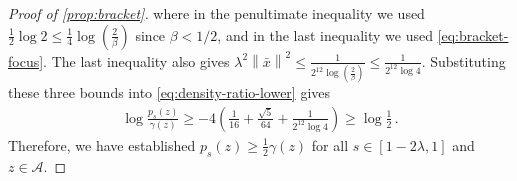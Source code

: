 \documentclass{article}
\newcommand{\1}{\mathbf 1}
\newcommand{\norm}[1]{\left\lVert #1\right\rVert}
\begin{document}
\begin{proof}[Proof of \cref{prop:bracket}]
    where in the penultimate inequality we used $
        \frac12\log2
        \leq \frac14\log\left(\frac{2}{\beta}\right)$ since $\beta<1/2$,
    and in the last inequality we used \eqref{eq:bracket-focus}.
    The last inequality also gives
    $\lambda^2\norm{\bar{x}}^2
        \leq
        \frac{1}{2^{12} \log\left(\frac{2}{\beta}\right)}
        \leq
        \frac{1}{2^{12} \log4}$.
    Substituting these three bounds into
    \eqref{eq:density-ratio-lower} gives
    \begin{align}
        \log\frac{p_s(z)}{\gamma(z)}
        \geq
        -4\left(\frac{1}{16}+\frac{\sqrt5}{64}+\frac{1}{2^{12} \log4}\right)
        \geq
        \log\frac12\,.
    \end{align}
    Therefore, we have established
    $p_s(z)
        \geq
        \frac12\gamma(z)$
    for all
    $s\in[1-2\lambda,1]$
    and
    $z\in\mathcal A$.


\end{proof}
\end{document}
